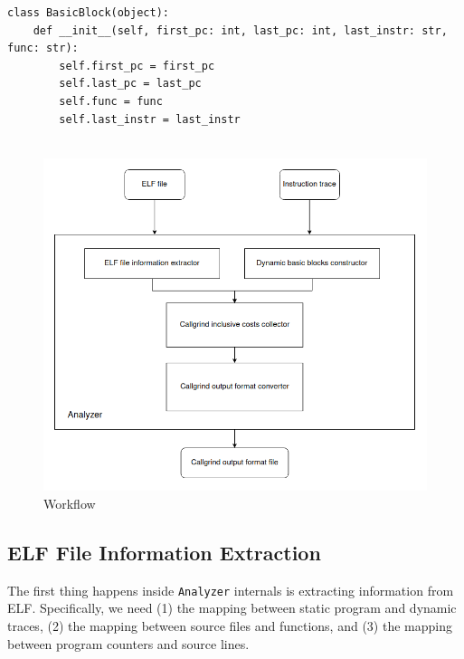 \begin{center}
\begin{minipage}{\textwidth}
\begin{lstlisting}
class BasicBlock(object):
    def __init__(self, first_pc: int, last_pc: int, last_instr: str, func: str):
        self.first_pc = first_pc
        self.last_pc = last_pc
        self.func = func
        self.last_instr = last_instr
    
\end{lstlisting}
\end{minipage}
\end{center}


\begin{figure}
    \centering
    \includegraphics[width=\linewidth]{figures/Analyzer_structure.png}
    \caption{Workflow}
    \label{fig:analyzer_structure}
\end{figure}

\subsection{ELF File Information Extraction} 
\label{subsec:elf_info_extraction}

The first thing happens inside \texttt{Analyzer} internals is extracting information from ELF. Specifically, we need (1) the mapping between static program and dynamic traces, (2) the mapping between source files and functions, and (3) the mapping between program counters and source lines.

